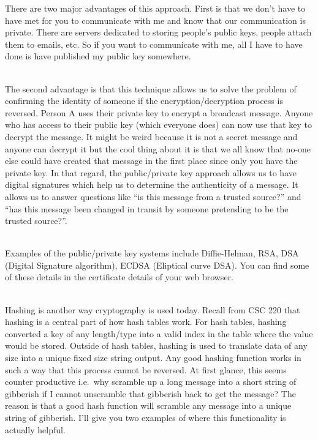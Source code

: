 \documentclass[
  letterpaper,
  DIV=11,
  numbers=noendperiod]{scrartcl}
\begin{document}
There are two major advantages of this approach. First is that we don't
have to have met for you to communicate with me and know that our
communication is private. There are servers dedicated to storing
people's public keys, people attach them to emails, etc. So if you want
to communicate with me, all I have to have done is have published my
public key somewhere.\\
\strut \\
The second advantage is that this technique allows us to solve the
problem of confirming the identity of someone if the
encryption/decryption process is reversed. Person A uses their private
key to encrypt a broadcast message. Anyone who has access to their
public key (which everyone does) can now use that key to decrypt the
message. It might be weird because it is not a secret message and anyone
can decrypt it but the cool thing about it is that we all know that
no-one else could have created that message in the first place since
only you have the private key. In that regard, the public/private key
approach allows us to have digital signatures which help us to determine
the authenticity of a message. It allows us to answer questions like
``is this message from a trusted source?'' and ``has this message been
changed in transit by someone pretending to be the trusted source?''.\\
\strut \\
Examples of the public/private key systems include Diffie-Helman, RSA,
DSA (Digital Signature algorithm), ECDSA (Eliptical curve DSA). You can
find some of these details in the certificate details of your web
browser.\\
\strut \\
Hashing is another way cryptography is used today. Recall from CSC 220
that hashing is a central part of how hash tables work. For hash tables,
hashing converted a key of any length/type into a valid index in the
table where the value would be stored. Outside of hash tables, hashing
is used to translate data of any size into a unique fixed size string
output. Any good hashing function works in such a way that this process
cannot be reversed. At first glance, this seems counter productive
i.e.~why scramble up a long message into a short string of gibberish if
I cannot unscramble that gibberish back to get the message? The reason
is that a good hash function will scramble any message into a unique
string of gibberish. I'll give you two examples of where this
functionality is actually helpful.\\
\strut \\
\end{document}

